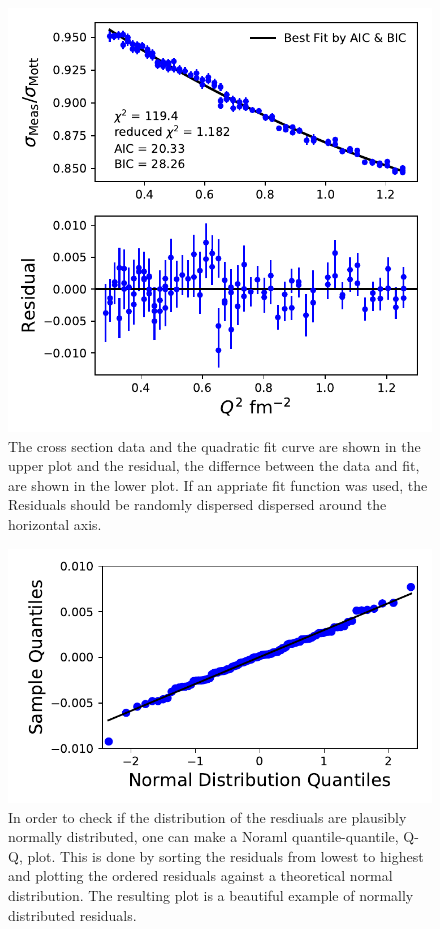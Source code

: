 \documentclass[10pt,aps,prc,twocolumn]{revtex4-1}
\begin{document}
\begin{figure}[htb]
\includegraphics[width=\columnwidth]{Figure/NewVsOld.pdf}
\caption{The cross section data and the quadratic fit curve are shown in the upper plot and the residual, the differnce between
the data and fit, are shown in the lower plot.    If an appriate fit function was used, the Residuals should be randomly dispersed
dispersed around the horizontal axis.}
\label{residual}
\end{figure}

\begin{figure}[htb]
\includegraphics[width=\columnwidth]{Figure/NormQQ.pdf}
\caption{In order to check if the distribution of the resdiuals are plausibly normally distributed, one can make a Noraml
 quantile-quantile, Q-Q, plot.
This is done by sorting the residuals from lowest to highest and plotting the ordered residuals against a theoretical 
normal distribution.   The resulting plot is a beautiful example of normally distributed residuals.}
\label{normqq}
\end{figure}
\end{document}
